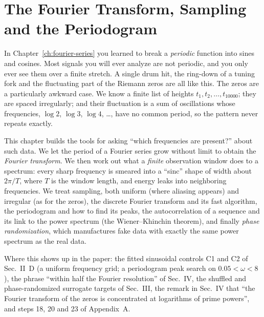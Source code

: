 \chapter{The Fourier Transform, Sampling and the Periodogram}\label{ch:fourier-transform}

\begin{chapterintro}
In Chapter~\ref{ch:fourier-series} you learned to break a \emph{periodic} function into sines and cosines. Most signals you will ever analyze are not periodic, and you only ever see them over a finite stretch. A single drum hit, the ring-down of a tuning fork and the fluctuating part of the Riemann zeros are all like this. The zeros are a particularly awkward case. We know a finite list of heights $t_1,t_2,\dots,t_{10000}$; they are spaced irregularly; and their fluctuation is a sum of oscillations whose frequencies, $\log 2$, $\log 3$, $\log 4$, \dots, have no common period, so the pattern never repeats exactly.

This chapter builds the tools for asking ``which frequencies are present?'' about such data. We let the period of a Fourier series grow without limit to obtain the \emph{Fourier transform}. We then work out what a \emph{finite} observation window does to a spectrum: every sharp frequency is smeared into a ``sinc'' shape of width about $2\pi/T$, where $T$ is the window length, and energy leaks into neighboring frequencies. We treat sampling, both uniform (where aliasing appears) and irregular (as for the zeros), the discrete Fourier transform and its fast algorithm, the periodogram and how to find its peaks, the autocorrelation of a sequence and its link to the power spectrum (the Wiener--Khinchin theorem), and finally \emph{phase randomization}, which manufactures fake data with exactly the same power spectrum as the real data.

Where this shows up in the paper: the fitted sinusoidal controls C1 and C2 of Sec.~II~D (a uniform frequency grid; a periodogram peak search on $0.05<\omega<8$), the phrase ``within half the Fourier resolution'' of Sec.~IV, the shuffled and phase-randomized surrogate targets of Sec.~III, the remark in Sec.~IV that ``the Fourier transform of the zeros is concentrated at logarithms of prime powers'', and steps 18, 20 and 23 of Appendix~A.
\end{chapterintro}

